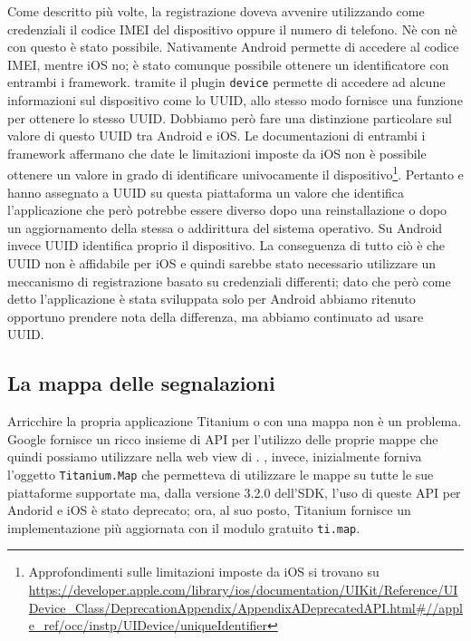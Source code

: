             Come descritto più volte, la registrazione doveva avvenire utilizzando
            come credenziali il codice IMEI del dispositivo oppure il numero di telefono.
            Nè con \pg{} nè con \tisdk{} questo è stato possibile. Nativamente
            Android permette di accedere al codice IMEI, mentre iOS no; è stato
            comunque possibile ottenere un identificatore con entrambi i
            framework. \pg{} tramite il plugin \texttt{device} permette di accedere
            ad alcune informazioni sul dispositivo come lo UUID, allo stesso
            modo \tisdk{} fornisce una funzione per ottenere lo stesso UUID.
            Dobbiamo però fare una distinzione particolare sul valore di questo
            UUID tra Android e iOS.
            Le documentazioni di entrambi i framework affermano che date le limitazioni
            imposte da iOS non è possibile ottenere un valore in grado di identificare
            univocamente il dispositivo\footnote{Approfondimenti sulle limitazioni
            imposte da iOS si trovano su \url{https://developer.apple.com/library/ios/documentation/UIKit/Reference/UIDevice_Class/DeprecationAppendix/AppendixADeprecatedAPI.html\#//apple_ref/occ/instp/UIDevice/uniqueIdentifier}}.
            Pertanto \pg{} e \tisdk{} hanno assegnato a UUID su questa piattaforma
            un valore che identifica l'applicazione che però potrebbe essere diverso
            dopo una reinstallazione o dopo
            un aggiornamento della stessa o addirittura del sistema operativo.
            Su Android invece UUID
            identifica proprio il dispositivo. La conseguenza di tutto ciò è che
            UUID non è affidabile per iOS e quindi sarebbe stato necessario utilizzare
            un meccanismo di registrazione basato su credenziali differenti;
            dato che però come detto l'applicazione è stata sviluppata solo per Android
            abbiamo ritenuto opportuno prendere nota della differenza, ma abbiamo
            continuato ad usare UUID.


        \subsection{La mappa delle segnalazioni}
            Arricchire la propria applicazione Titanium o \pg{} con una mappa
            non è un problema. Google fornisce un ricco insieme di API \js{} per
            l'utilizzo delle proprie mappe che quindi possiamo utilizzare nella
            web view di \pg{}. \tisdk, invece, inizialmente forniva l'oggetto
            \texttt{Titanium.Map} che permetteva di utilizzare le mappe su tutte
            le sue piattaforme supportate ma, dalla versione 3.2.0 dell'SDK, l'uso
            di queste API per Andorid e iOS è stato deprecato; ora, al suo posto,
            Titanium fornisce un implementazione più aggiornata con il modulo
            gratuito \texttt{ti.map}.

